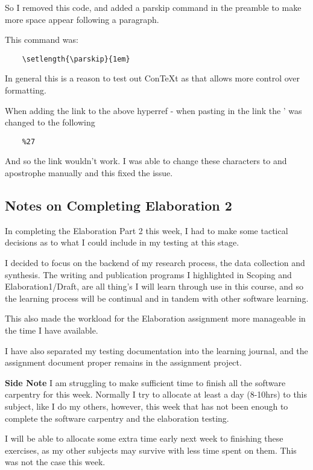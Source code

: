 \documentclass{article}
\begin{document}
So I removed this code, and added a parskip command in the preamble to make more space appear following a paragraph.

This command was:
\begin{verbatim}
    \setlength{\parskip}{1em}
\end{verbatim}

In general this is a reason to test out ConTeXt as that allows more control over formatting. 

\label{Error: copying links to Overleaf}
When adding the link to the above hyperref - when pasting in the link the ' was changed to the following
\begin{verbatim}
    %27
\end{verbatim}

And so the link wouldn't work. I was able to change these characters to and apostrophe manually and this fixed the issue.

\subsection{Notes on Completing Elaboration 2}
In completing the Elaboration Part 2 this week, I had to make some tactical decisions as to what I could include in my testing at this stage. 

I decided to focus on the backend of my research process, the data collection and synthesis. 
The writing and publication programs I highlighted in Scoping and Elaboration1/Draft, are all thing's I will learn through use in this course, and so the learning process will be continual and in tandem with other software learning. 

This also made the workload for the Elaboration assignment more manageable in the time I have available.

I have also separated my testing documentation into the learning journal, and the assignment document proper remains in the assignment project.

\textbf{Side Note}
I am struggling to make sufficient time to finish all the software carpentry for this week. Normally I try to allocate at least a day (8-10hrs) to this subject, like I do my others, however, this week that has not been enough to complete the software carpentry and the elaboration testing.

I will be able to allocate some extra time early next week to finishing these exercises, as my other subjects may survive with less time spent on them. This was not the case this week.
\end{document}
